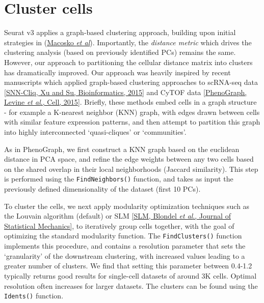 \documentclass[
]{book}
\begin{document}
\hypertarget{section-8}{%
\subsubsection*{}\label{section-8}}

\hypertarget{cluster-cells}{%
\section{Cluster cells}\label{cluster-cells}}

Seurat v3 applies a graph-based clustering approach, building upon initial strategies in (\href{http://www.cell.com/abstract/S0092-8674(15)00549-8}{Macosko \emph{et al}}). Importantly, the \emph{distance metric} which drives the clustering analysis (based on previously identified PCs) remains the same. However, our approach to partitioning the cellular distance matrix into clusters has dramatically improved. Our approach was heavily inspired by recent manuscripts which applied graph-based clustering approaches to scRNA-seq data \href{http://bioinformatics.oxfordjournals.org/content/early/2015/02/10/bioinformatics.btv088.abstract}{{[}SNN-Cliq, Xu and Su, Bioinformatics, 2015{]}} and CyTOF data \href{http://www.ncbi.nlm.nih.gov/pubmed/26095251}{{[}PhenoGraph, Levine \emph{et al}., Cell, 2015{]}}. Briefly, these methods embed cells in a graph structure - for example a K-nearest neighbor (KNN) graph, with edges drawn between cells with similar feature expression patterns, and then attempt to partition this graph into highly interconnected `quasi-cliques' or `communities'.

As in PhenoGraph, we first construct a KNN graph based on the euclidean distance in PCA space, and refine the edge weights between any two cells based on the shared overlap in their local neighborhoods (Jaccard similarity). This step is performed using the \texttt{FindNeighbors()} function, and takes as input the previously defined dimensionality of the dataset (first 10 PCs).

To cluster the cells, we next apply modularity optimization techniques such as the Louvain algorithm (default) or SLM \href{http://dx.doi.org/10.1088/1742-5468/2008/10/P10008}{{[}SLM, Blondel \emph{et al}., Journal of Statistical Mechanics{]}}, to iteratively group cells together, with the goal of optimizing the standard modularity function. The \texttt{FindClusters()} function implements this procedure, and contains a resolution parameter that sets the `granularity' of the downstream clustering, with increased values leading to a greater number of clusters. We find that setting this parameter between 0.4-1.2 typically returns good results for single-cell datasets of around 3K cells. Optimal resolution often increases for larger datasets. The clusters can be found using the \texttt{Idents()} function.
\end{document}
